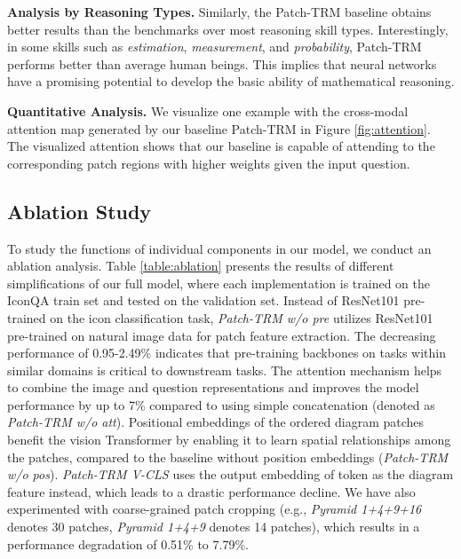 \documentclass{article}
\begin{document}
\textbf{Analysis by Reasoning Types.} Similarly, the Patch-TRM baseline obtains better results than the benchmarks over most reasoning skill types. Interestingly, in some skills such as \textit{estimation}, \textit{measurement}, and \textit{probability}, Patch-TRM performs better than average human beings. This implies that neural networks have a promising potential to develop the basic ability of mathematical reasoning.

\textbf{Quantitative Analysis.} We visualize one example with the cross-modal attention map generated by our baseline Patch-TRM in Figure \ref{fig:attention}. The visualized attention shows that our baseline is capable of attending to the corresponding patch regions with higher weights given the input question. 








\subsection{Ablation Study}
To study the functions of individual components in our model, we conduct an ablation analysis. Table \ref{table:ablation} presents the results of different simplifications of our full model, where each implementation is trained on the IconQA train set and tested on the validation set. Instead of ResNet101 pre-trained on the icon classification task, \textit{Patch-TRM w/o pre} utilizes ResNet101 pre-trained on natural image data for patch feature extraction. The decreasing performance of 0.95-2.49\% indicates that pre-training backbones on tasks within similar domains is critical to downstream tasks. The attention mechanism helps to combine the image and question representations and improves the model performance by up to 7\% compared to using simple concatenation (denoted as \textit{Patch-TRM w/o att}). Positional embeddings of the ordered diagram patches benefit the vision Transformer by enabling it to learn spatial relationships among the patches, compared to the baseline without position embeddings (\textit{Patch-TRM w/o pos}). \textit{Patch-TRM V-CLS} uses the output embedding of  token as the diagram feature instead, which leads to a drastic performance decline. We have also experimented with coarse-grained patch cropping (e.g., \textit{Pyramid 1+4+9+16} denotes 30 patches, \textit{Pyramid 1+4+9} denotes 14 patches), which results in  a performance degradation of 0.51\% to 7.79\%. 
\end{document}
